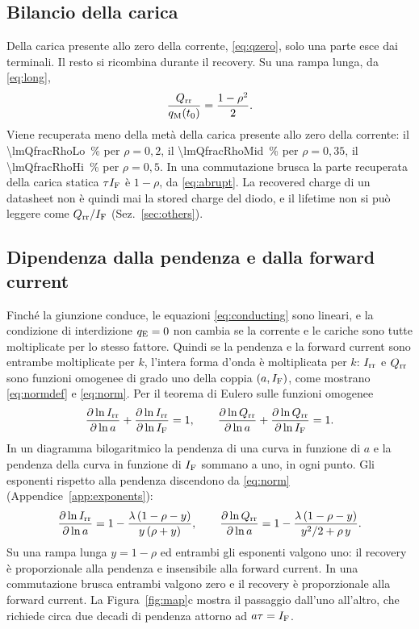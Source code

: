 \documentclass[10pt,a4paper]{scrartcl}
\let\newcommand\lmitdefine
\newcommand{\IF}{I_\mathrm{F}}
\newcommand{\Irr}{I_\mathrm{rr}}
\newcommand{\Qrr}{Q_\mathrm{rr}}
\newcommand{\qE}{q_\mathrm{E}}
\newcommand{\qM}{q_\mathrm{M}}
\begin{document}
\subsection{Bilancio della carica}
Della carica presente allo zero della corrente, \eqref{eq:qzero}, solo una parte esce dai terminali. Il resto si ricombina durante il recovery. Su una rampa lunga, da \eqref{eq:long},
\begin{equation}
\frac{\Qrr}{\qM(t_0)} = \frac{1-\rho^2}{2} .
\label{eq:fraction}
\end{equation}
Viene recuperata meno della metà della carica presente allo zero della corrente: il \SI{\lmQfracRhoLo}{\percent} per $\rho = 0,2$, il \SI{\lmQfracRhoMid}{\percent} per $\rho = 0,35$, il \SI{\lmQfracRhoHi}{\percent} per $\rho = 0,5$. In una commutazione brusca la parte recuperata della carica statica $\tau\IF$ è $1-\rho$, da \eqref{eq:abrupt}. La recovered charge di un datasheet non è quindi mai la stored charge del diodo, e il lifetime non si può leggere come $\Qrr/\IF$ (Sez.~\ref{sec:others}).

\subsection{Dipendenza dalla pendenza e dalla forward current}
\label{sec:exponents}
Finché la giunzione conduce, le equazioni \eqref{eq:conducting} sono lineari, e la condizione di interdizione $\qE = 0$ non cambia se la corrente e le cariche sono tutte moltiplicate per lo stesso fattore. Quindi se la pendenza e la forward current sono entrambe moltiplicate per $k$, l'intera forma d'onda è moltiplicata per $k$: $\Irr$ e $\Qrr$ sono funzioni omogenee di grado uno della coppia $(a, \IF)$, come mostrano \eqref{eq:normdef} e \eqref{eq:norm}. Per il teorema di Eulero sulle funzioni omogenee
\begin{equation}
\frac{\partial \ln \Irr}{\partial \ln a} + \frac{\partial \ln \Irr}{\partial \ln \IF} = 1 , \qquad
\frac{\partial \ln \Qrr}{\partial \ln a} + \frac{\partial \ln \Qrr}{\partial \ln \IF} = 1 .
\label{eq:euler}
\end{equation}
In un diagramma bilogaritmico la pendenza di una curva in funzione di $a$ e la pendenza della curva in funzione di $\IF$ sommano a uno, in ogni punto. Gli esponenti rispetto alla pendenza discendono da \eqref{eq:norm} (Appendice~\ref{app:exponents}):
\begin{equation}
\frac{\partial \ln \Irr}{\partial \ln a} = 1 - \frac{\lambda\,(1-\rho-y)}{y\,(\rho+y)} , \qquad
\frac{\partial \ln \Qrr}{\partial \ln a} = 1 - \frac{\lambda\,(1-\rho-y)}{y^2/2+\rho\,y} .
\label{eq:exponents}
\end{equation}
Su una rampa lunga $y = 1-\rho$ ed entrambi gli esponenti valgono uno: il recovery è proporzionale alla pendenza e insensibile alla forward current. In una commutazione brusca entrambi valgono zero e il recovery è proporzionale alla forward current. La Figura~\ref{fig:map}c mostra il passaggio dall'uno all'altro, che richiede circa due decadi di pendenza attorno ad $a\tau = \IF$.
\end{document}
